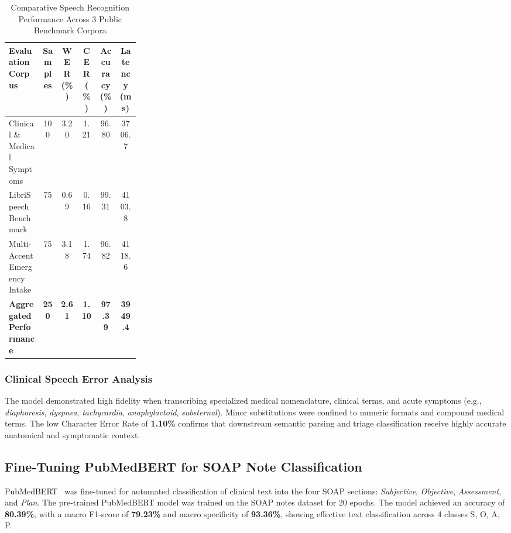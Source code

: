 \documentclass[conference]{IEEEtran}
\begin{document}
\begin{table}[htbp]
\centering
\caption{Comparative Speech Recognition Performance Across 3 Public Benchmark Corpora}
\label{tab:speech_comparative_results}
\footnotesize
\setlength{\tabcolsep}{2pt}
\renewcommand{\arraystretch}{1.15}
\begin{tabularx}{\linewidth}{|>{\raggedright\arraybackslash}p{0.26\linewidth}|C|C|C|C|C|}
\hline
\textbf{Evaluation Corpus} & \textbf{Samples} & \textbf{WER (\%)} & \textbf{CER (\%)} & \textbf{Accuracy (\%)} & \textbf{Latency (ms)} \\
\hline
Clinical \& Medical Symptoms & 100 & 3.20 & 1.21 & 96.80 & 3706.7 \\
\hline
LibriSpeech Benchmark & 75 & 0.69 & 0.16 & 99.31 & 4103.8 \\
\hline
Multi-Accent Emergency Intake & 75 & 3.18 & 1.74 & 96.82 & 4118.6 \\
\hline
\textbf{Aggregated Performance} & \textbf{250} & \textbf{2.61} & \textbf{1.10} & \textbf{97.39} & \textbf{3949.4} \\
\hline
\end{tabularx}
\end{table}

\subsubsection{Clinical Speech Error Analysis}
The model demonstrated high fidelity when transcribing specialized medical nomenclature, clinical terms, and acute symptoms (e.g., \textit{diaphoresis}, \textit{dyspnea}, \textit{tachycardia}, \textit{anaphylactoid}, \textit{substernal}). Minor substitutions were confined to numeric formats and compound medical terms. The low Character Error Rate of \textbf{1.10\%} confirms that downstream semantic parsing and triage classification receive highly accurate anatomical and symptomatic context.

\subsection{Fine-Tuning PubMedBERT for SOAP Note Classification}

PubMedBERT~\cite{gu2021} was fine-tuned for automated classification of clinical text into the four SOAP sections: \textit{Subjective}, \textit{Objective}, \textit{Assessment}, and \textit{Plan}. The pre-trained PubMedBERT model was trained on the SOAP notes dataset for 20 epochs. The model achieved an accuracy of \textbf{80.39\%}, with a macro F1-score of \textbf{79.23\%} and macro specificity of \textbf{93.36\%}, showing effective text classification across 4 classes S, O, A, P.
\end{document}
